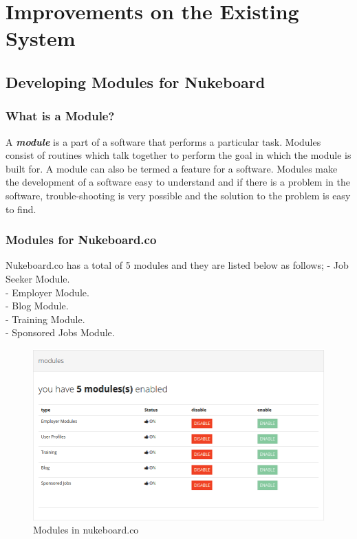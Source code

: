 
\chapter{Improvements on the Existing System} %

\label{Chapter3} %


\section{Developing Modules for Nukeboard}

\subsection{What is a Module?}

A \textbf{\textit{module}} is a part of a software that performs a particular task. Modules consist of routines which talk together to perform the goal in which the module is built for. A module can also be termed a feature for a software. Modules make the development of a software easy to understand and if there is a problem in the software, trouble-shooting is very possible and the solution to the problem is easy to find.

\subsection{Modules for Nukeboard.co}

Nukeboard.co has a total of 5 modules and they are listed below as follows;
- Job Seeker Module. \\
- Employer Module. \\
- Blog Module. \\
- Training Module. \\
- Sponsored Jobs Module. \\

\begin{figure}[h]
\centering
\includegraphics[width=13cm,scale=1.5]{Figures/Modules}
\decoRule
\caption[Nukeboard Modules]{Modules in nukeboard.co}
\label{fig:Modules}
\end{figure}

